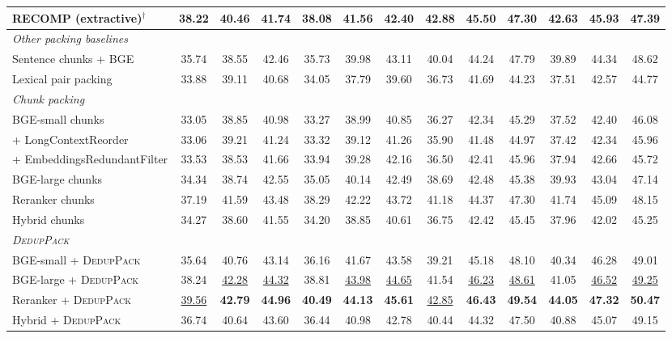 \documentclass[11pt]{article}
\newcommand{\spk}{\textsc{DedupPack}}
\begin{document}
\begin{table}[t]
{\begin{tabular}{l ccc ccc ccc ccc}
RECOMP (extractive)$^\dagger$ & 38.22 & 40.46 & 41.74 & 38.08 & 41.56 & 42.40 & \textbf{42.88} & 45.50 & 47.30 & 42.63 & 45.93 & 47.39 \\
\midrule
\multicolumn{13}{l}{\textit{Other packing baselines}} \\
Sentence chunks + BGE & 35.74 & 38.55 & 42.46 & 35.73 & 39.98 & 43.11 & 40.04 & 44.24 & 47.79 & 39.89 & 44.34 & 48.62 \\
Lexical pair packing & 33.88 & 39.11 & 40.68 & 34.05 & 37.79 & 39.60 & 36.73 & 41.69 & 44.23 & 37.51 & 42.57 & 44.77 \\
\midrule
\multicolumn{13}{l}{\textit{Chunk packing}} \\
BGE-small chunks & 33.05 & 38.85 & 40.98 & 33.27 & 38.99 & 40.85 & 36.27 & 42.34 & 45.29 & 37.52 & 42.40 & 46.08 \\
\quad + LongContextReorder & 33.06 & 39.21 & 41.24 & 33.32 & 39.12 & 41.26 & 35.90 & 41.48 & 44.97 & 37.42 & 42.34 & 45.96 \\
\quad + EmbeddingsRedundantFilter & 33.53 & 38.53 & 41.66 & 33.94 & 39.28 & 42.16 & 36.50 & 42.41 & 45.96 & 37.94 & 42.66 & 45.72 \\
BGE-large chunks & 34.34 & 38.74 & 42.55 & 35.05 & 40.14 & 42.49 & 38.69 & 42.48 & 45.38 & 39.93 & 43.04 & 47.14 \\
Reranker chunks & 37.19 & 41.59 & 43.48 & 38.29 & 42.22 & 43.72 & 41.18 & 44.37 & 47.30 & 41.74 & 45.09 & 48.15 \\
Hybrid chunks & 34.27 & 38.60 & 41.55 & 34.20 & 38.85 & 40.61 & 36.75 & 42.42 & 45.45 & 37.96 & 42.02 & 45.25 \\
\midrule
\multicolumn{13}{l}{\textit{\spk{}}} \\
BGE-small + \spk{} & 35.64 & 40.76 & 43.14 & 36.16 & 41.67 & 43.58 & 39.21 & 45.18 & 48.10 & 40.34 & 46.28 & 49.01 \\
BGE-large + \spk{} & 38.24 & \underline{42.28} & \underline{44.32} & 38.81 & \underline{43.98} & \underline{44.65} & 41.54 & \underline{46.23} & \underline{48.61} & 41.05 & \underline{46.52} & \underline{49.25} \\
Reranker + \spk{} & \underline{39.56} & \textbf{42.79} & \textbf{44.96} & \textbf{40.49} & \textbf{44.13} & \textbf{45.61} & \underline{42.85} & \textbf{46.43} & \textbf{49.54} & \textbf{44.05} & \textbf{47.32} & \textbf{50.47} \\
Hybrid + \spk{} & 36.74 & 40.64 & 43.60 & 36.44 & 40.98 & 42.78 & 40.44 & 44.32 & 47.50 & 40.88 & 45.07 & 49.15 \\
\bottomrule
\end{tabular}}

\end{table}
\end{document}

